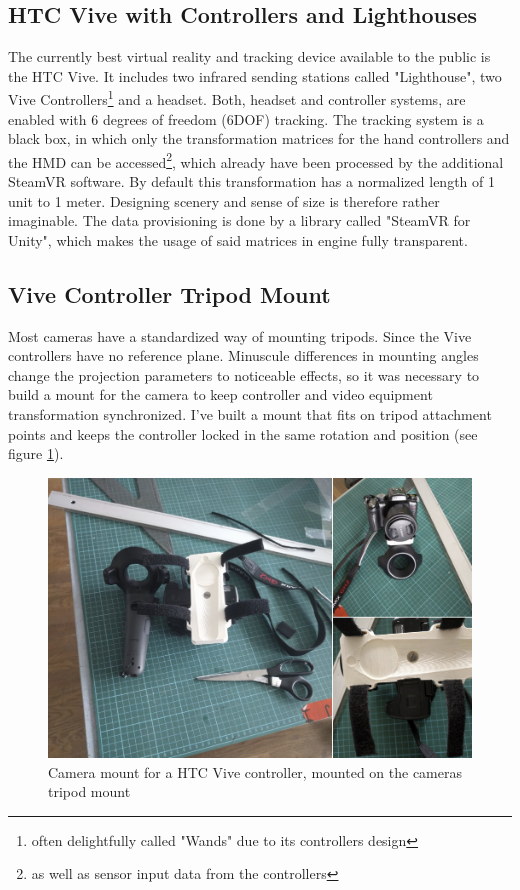 \subsection{HTC Vive with Controllers and Lighthouses}
The currently best virtual reality and tracking device available to the public 
is the HTC Vive. It includes two infrared sending stations called "Lighthouse", 
two Vive Controllers\footnote{often delightfully called "Wands" due to its 
controllers design} and a headset. Both, headset and controller systems, are 
enabled with 6 degrees of freedom (6DOF) 
tracking. The tracking system is a black box, in which only the transformation 
matrices for the hand controllers and the HMD can be accessed\footnote{as well 
as sensor input data from the controllers}, which already have been processed 
by the additional SteamVR software. By default this transformation has a 
normalized length of 1 unit to 1 meter. Designing scenery and sense of size is 
therefore rather imaginable. The data provisioning is done by a library called 
"SteamVR for Unity", which makes the usage of said matrices in engine fully 
transparent.

\subsection{Vive Controller Tripod Mount}
Most cameras have a standardized way of mounting tripods. Since the Vive  
controllers have no reference plane. Minuscule differences in mounting angles 
change the projection parameters to noticeable effects, so it was necessary to 
build a mount for the camera to keep controller and video equipment 
transformation synchronized. I've built a mount that fits on tripod attachment 
points and keeps the controller locked in the same rotation and position (see 
figure \ref{fig:system:camera-mount}).

\begin{figure}[htb]
	\includegraphics[width=\textwidth]{_raw_resources/ViveStrap-Mount.png}
	\caption{Camera mount for a HTC Vive controller, mounted on the cameras 
	tripod mount}
	\label{fig:system:camera-mount}
\end{figure} 

